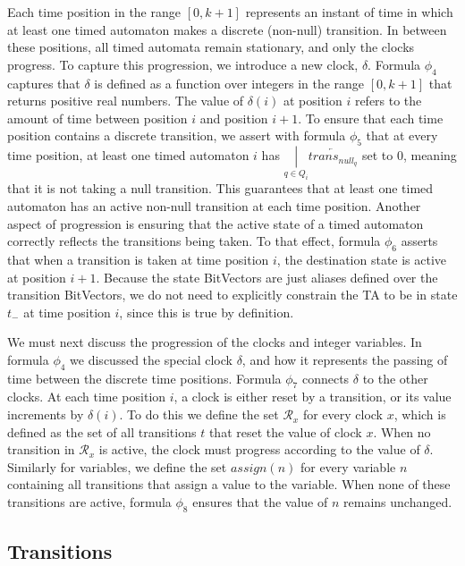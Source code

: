 \documentclass[a4paper,12pt]{article}
\newcommand*\BitOr{\mathbin{|}}
\begin{document}
Each time position in the range \([0,k+1]\) represents an instant of time in
which at least one timed automaton makes a discrete (non-null) transition. In
between these positions, all timed automata remain stationary, and only the
clocks progress. To capture this progression, we introduce a new clock,
\(\delta\). Formula \(\phi_4\) captures that \(\delta\) is defined as a function
over integers in the range \([0,k+1]\) that returns positive real numbers. The
value of \(\delta(i)\) at position \(i\) refers to the amount of time between
position \(i\) and position \(i+1\). To ensure that each time position contains
a discrete transition, we assert with formula \(\phi_5\) that at every time
position, at least one timed automaton \(i\) has
\(\underset{q \in Q_{i}}{\BitOr}\overleftarrow{trans_{null_q}}\) set to 0,
meaning that it is not taking a null transition. This guarantees that at least
one timed automaton has an active non-null transition at each time position.
Another aspect of progression is ensuring that the active state of a timed
automaton correctly reflects the transitions being taken. To that effect,
formula \(\phi_6\) asserts that when a transition is taken at time position
\(i\), the destination state is active at position \(i{+}1\). Because the state
BitVectors are just aliases defined over the transition BitVectors, we do not
need to explicitly constrain the TA to be in state \(t_{-}\) at time position
\(i\), since this is true by definition.

We must next discuss the progression of the clocks and integer variables. In
formula \(\phi_4\) we discussed the special clock \(\delta\), and how it
represents the passing of time between the discrete time positions. Formula
\(\phi_7\) connects \(\delta\) to the other clocks. At each time position \(i\),
a clock is either reset by a transition, or its value increments by
\(\delta(i)\). To do this we define the set \(\mathcal{R}_x\) for every clock
\(x\), which is defined as the set of all transitions \(t\) that reset the value
of clock \(x\). When no transition in \(\mathcal{R}_x\) is active, the clock
must progress according to the value of \(\delta\). Similarly for variables, we
define the set \(assign(n)\) for every variable \(n\) containing all transitions
that assign a value to the variable. When none of these transitions are active,
formula \(\phi_8\) ensures that the value of \(n\) remains unchanged.

\subsection{Transitions}\label{consstraints-trans}
\end{document}
